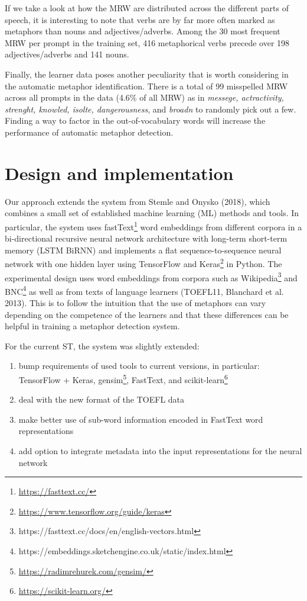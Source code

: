 \documentclass[11pt,a4paper]{article}
\begin{document}
If we take a look at how the MRW are distributed across the different parts of speech, it is interesting to note that verbs are by far more often marked as metaphors than nouns and adjectives/adverbs. Among the 30 most frequent MRW per prompt in the training set, 416 metaphorical verbs precede over 198 adjectives/adverbs and 141 nouns.

Finally, the learner data poses another peculiarity that is worth considering in the automatic metaphor identification. There is a total of 99 misspelled MRW across all prompts in the data (4.6\% of all MRW) as in \emph{messege, actractivity, strenght, knowled, isolte, dangerousness}, and \emph{broadn} to randomly pick out a few. Finding a way to factor in the out-of-vocabulary words will increase the performance of automatic metaphor detection. 

  
\section{Design and implementation}

Our approach extends the system from Stemle and Onysko (2018), which combines a small set of established machine learning (ML) methods and tools. In particular, the system uses fastText\footnote{\url{https://fasttext.cc/}} word embeddings from different corpora in a bi-directional recursive neural network architecture with long-term short-term memory (LSTM BiRNN) and implements a flat sequence-to-sequence neural network with one hidden layer using TensorFlow and Keras\footnote{\url{https://www.tensorflow.org/guide/keras}} in Python.
The experimental design uses word embeddings from corpora such as Wikipedia\footnote{https://fasttext.cc/docs/en/english-vectors.html} and BNC\footnote{https://embeddings.sketchengine.co.uk/static/index.html} as well as from texts of language learners (TOEFL11, Blanchard et al. 2013). This is to follow the intuition that the use of metaphors can vary depending on the competence of the learners and that these differences can be helpful in training a metaphor detection system.

For the current ST, the system was slightly extended: 
\begin{enumerate}
\item bump requirements of used tools to current versions, in particular: TensorFlow  + Keras, gensim\footnote{\url{https://radimrehurek.com/gensim/}}, FastText, and scikit-learn\footnote{\url{https://scikit-learn.org/}}
\item deal with the new format of the TOEFL data
\item make better use of sub-word information encoded in FastText word representations
\item add option to integrate metadata into the input representations for the neural network
\end{enumerate}
\end{document}
